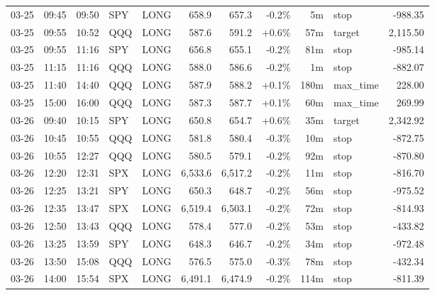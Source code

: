 \documentclass[11pt,a4paper,twoside]{article}
\begin{document}
\begin{center}
\begin{longtable}{>{\color{txtmain}}l l l l l r r r r >{\color{txtmain}}l r}
03-25 & 09:45 & 09:50 & SPY & LONG & 658.9 & 657.3 & \textcolor{lossred}{-0.2\%} & 5m & stop & \textcolor{lossred}{-988.35} \\
03-25 & 09:55 & 10:52 & QQQ & LONG & 587.6 & 591.2 & \textcolor{wingreen}{+0.6\%} & 57m & target & \textcolor{wingreen}{2,115.50} \\
03-25 & 09:55 & 11:16 & SPY & LONG & 656.8 & 655.1 & \textcolor{lossred}{-0.2\%} & 81m & stop & \textcolor{lossred}{-985.14} \\
03-25 & 11:15 & 11:16 & QQQ & LONG & 588.0 & 586.6 & \textcolor{lossred}{-0.2\%} & 1m & stop & \textcolor{lossred}{-882.07} \\
03-25 & 11:40 & 14:40 & QQQ & LONG & 587.9 & 588.2 & \textcolor{wingreen}{+0.1\%} & 180m & max\_time & \textcolor{wingreen}{228.00} \\
03-25 & 15:00 & 16:00 & QQQ & LONG & 587.3 & 587.7 & \textcolor{wingreen}{+0.1\%} & 60m & max\_time & \textcolor{wingreen}{269.99} \\
03-26 & 09:40 & 10:15 & SPY & LONG & 650.8 & 654.7 & \textcolor{wingreen}{+0.6\%} & 35m & target & \textcolor{wingreen}{2,342.92} \\
03-26 & 10:45 & 10:55 & QQQ & LONG & 581.8 & 580.4 & \textcolor{lossred}{-0.3\%} & 10m & stop & \textcolor{lossred}{-872.75} \\
03-26 & 10:55 & 12:27 & QQQ & LONG & 580.5 & 579.1 & \textcolor{lossred}{-0.2\%} & 92m & stop & \textcolor{lossred}{-870.80} \\
03-26 & 12:20 & 12:31 & SPX & LONG & 6,533.6 & 6,517.2 & \textcolor{lossred}{-0.2\%} & 11m & stop & \textcolor{lossred}{-816.70} \\
03-26 & 12:25 & 13:21 & SPY & LONG & 650.3 & 648.7 & \textcolor{lossred}{-0.2\%} & 56m & stop & \textcolor{lossred}{-975.52} \\
03-26 & 12:35 & 13:47 & SPX & LONG & 6,519.4 & 6,503.1 & \textcolor{lossred}{-0.2\%} & 72m & stop & \textcolor{lossred}{-814.93} \\
03-26 & 12:50 & 13:43 & QQQ & LONG & 578.4 & 577.0 & \textcolor{lossred}{-0.2\%} & 53m & stop & \textcolor{lossred}{-433.82} \\
03-26 & 13:25 & 13:59 & SPY & LONG & 648.3 & 646.7 & \textcolor{lossred}{-0.2\%} & 34m & stop & \textcolor{lossred}{-972.48} \\
03-26 & 13:50 & 15:08 & QQQ & LONG & 576.5 & 575.0 & \textcolor{lossred}{-0.3\%} & 78m & stop & \textcolor{lossred}{-432.34} \\
03-26 & 14:00 & 15:54 & SPX & LONG & 6,491.1 & 6,474.9 & \textcolor{lossred}{-0.2\%} & 114m & stop & \textcolor{lossred}{-811.39} \\

\end{longtable}
\end{center}
\end{document}
